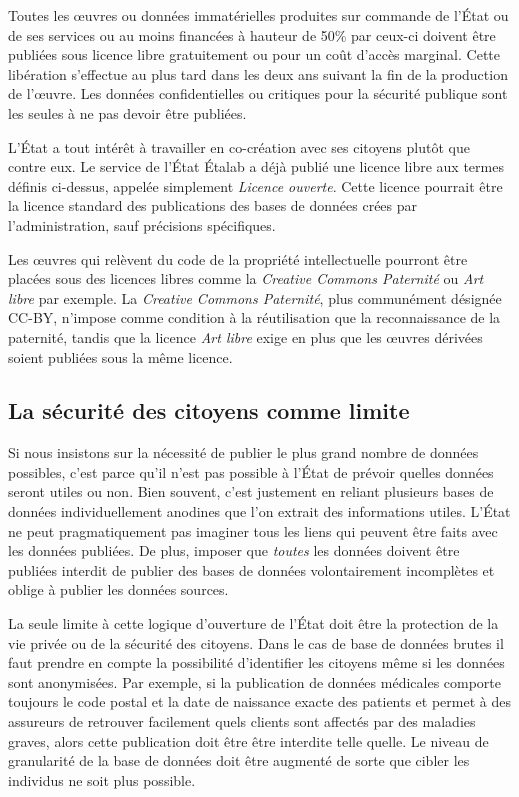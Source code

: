 \begin{mesure}
Toutes les œuvres ou données immatérielles produites sur commande de l'État ou de ses services ou au moins financées à hauteur de 50\% par ceux-ci doivent être publiées sous licence libre gratuitement ou pour un coût d'accès marginal. Cette libération s'effectue au plus tard dans les deux ans suivant la fin de la production de l'œuvre. Les données confidentielles ou critiques pour la sécurité publique sont les seules à ne pas devoir être publiées.
\end{mesure}

L'État a tout intérêt à travailler en co-création avec ses citoyens plutôt que contre eux. Le service de l'État Étalab a déjà publié une licence libre aux termes définis ci-dessus, appelée simplement \textit{Licence ouverte}. Cette licence pourrait être la licence standard des publications des bases de données crées par l'administration, sauf précisions spécifiques. 

Les œuvres qui relèvent du code de la propriété intellectuelle pourront être placées sous des licences libres comme la \textit{Creative Commons Paternité} ou \textit{Art libre} par exemple. La \textit{Creative Commons Paternité}, plus communément désignée CC-BY, n'impose comme condition à la réutilisation que la reconnaissance de la paternité, tandis que la licence \textit{Art libre} exige en plus que les œuvres dérivées soient publiées sous la même licence.

\subsection{La sécurité des citoyens comme limite}
Si nous insistons sur la nécessité de publier le plus grand nombre de données possibles, c'est parce qu'il n'est pas possible à l'État de prévoir quelles données seront utiles ou non. Bien souvent, c'est justement en reliant plusieurs bases de données individuellement anodines que l'on extrait des informations utiles. L'État ne peut pragmatiquement pas imaginer tous les liens qui peuvent être faits avec les données publiées. De plus, imposer que \emph{toutes} les données doivent être publiées interdit de publier des bases de données volontairement incomplètes et oblige à publier les données sources. 

La seule limite à cette logique d'ouverture de l'État doit être la protection de la vie privée ou de la sécurité des citoyens. Dans le cas de base de données brutes il faut prendre en compte la possibilité d'identifier les citoyens même si les données sont anonymisées. Par exemple, si la publication de données médicales comporte toujours le code postal et la date de naissance exacte des patients et permet à des assureurs de retrouver facilement quels clients sont affectés par des maladies graves, alors cette publication doit être être interdite telle quelle. Le niveau de granularité de la base de données doit être augmenté de sorte que cibler les individus ne soit plus possible.

